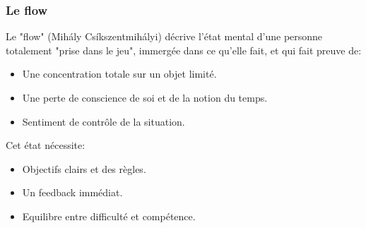 \subsubsection{Le flow}

Le "flow" (Mih\'aly Cs\'ikszentmih\'alyi) d\'ecrive l'\'etat mental d'une personne totalement "prise dans le jeu", immerg\'ee dans ce qu'elle fait, et qui fait preuve de:

\begin{itemize}
\item Une concentration totale sur un objet limit\'e.
\item Une perte de conscience de soi et de la notion du temps.
\item Sentiment de contr\^ole de la situation.
\end{itemize}

Cet \'etat n\'ecessite:

\begin{itemize}
\item Objectifs clairs et des r\`egles.
\item Un feedback imm\'ediat.
\item Equilibre entre difficult\'e et comp\'etence.
\end{itemize}

\begin{figure}[H]
\centering
{}
\end{figure}

